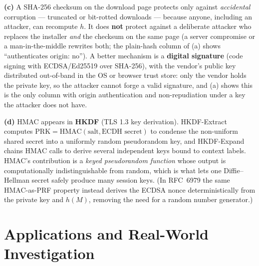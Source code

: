 \documentclass[11pt,a4paper]{article}
\begin{document}
\textbf{(c)} A SHA-256 checksum on the download page protects only against \emph{accidental} corruption
--- truncated or bit-rotted downloads --- because anyone, including an attacker, can recompute $h$. It
does \textbf{not} protect against a deliberate attacker who replaces the installer \emph{and} the
checksum on the same page (a server compromise or a man-in-the-middle rewrites both; the plain-hash
column of (a) shows ``authenticates origin: no''). A better mechanism is a \textbf{digital signature}
(code signing with ECDSA/Ed25519 over SHA-256), with the vendor's public key distributed out-of-band in
the OS or browser trust store: only the vendor holds the private key, so the attacker cannot forge a
valid signature, and (a) shows this is the only column with origin authentication and non-repudiation
under a key the attacker does not have.

\textbf{(d)} HMAC appears in \textbf{HKDF} (TLS 1.3 key derivation). HKDF-Extract computes
$\mathrm{PRK}=\mathrm{HMAC}(\text{salt},\text{ECDH secret})$ to condense the non-uniform shared secret
into a uniformly random pseudorandom key, and HKDF-Expand chains HMAC calls to derive several independent
keys bound to context labels. HMAC's contribution is a \emph{keyed pseudorandom function} whose output
is computationally indistinguishable from random, which is what lets one Diffie--Hellman secret safely
produce many session keys. (In RFC~6979 the same HMAC-as-PRF property instead derives the ECDSA nonce
deterministically from the private key and $h(M)$, removing the need for a random number generator.)

\section*{Applications and Real-World Investigation}
\end{document}
